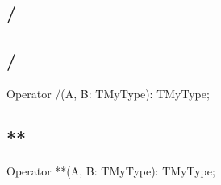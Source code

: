 \documentclass{report}
\newif\ifpdf
\begin{document}
\subsection*{\large{\textbf{/}}\normalsize\hspace{1ex}\hrulefill}
\else
\subsection*{/}
\fi
\label{ok_operator_test-/}
\index{/}
\begin{list}{}{
\setlength{\itemindent}{0cm}
\setlength{\listparindent}{0cm}
\setlength{\leftmargin}{\evensidemargin}
\addtolength{\leftmargin}{\tmplength}
\settowidth{\labelsep}{X}
\addtolength{\leftmargin}{\labelsep}
\setlength{\labelwidth}{\tmplength}
}
\item[\textbf{Declaration}\hfill]
\ifpdf
\begin{flushleft}
\fi
\begin{ttfamily}
Operator /(A, B: TMyType): TMyType;\end{ttfamily}

\ifpdf
\end{flushleft}
\fi

\end{list}
\ifpdf
\subsection*{\large{\textbf{**}}\normalsize\hspace{1ex}\hrulefill}
\else
\subsection*{**}
\fi
\label{ok_operator_test-**}
\index{**}
\begin{list}{}{
\setlength{\itemindent}{0cm}
\setlength{\listparindent}{0cm}
\setlength{\leftmargin}{\evensidemargin}
\addtolength{\leftmargin}{\tmplength}
\settowidth{\labelsep}{X}
\addtolength{\leftmargin}{\labelsep}
\setlength{\labelwidth}{\tmplength}
}
\item[\textbf{Declaration}\hfill]
\ifpdf
\begin{flushleft}
\fi
\begin{ttfamily}
Operator **(A, B: TMyType): TMyType;\end{ttfamily}

\ifpdf
\end{flushleft}
\fi

\end{list}
\ifpdf
\end{document}
